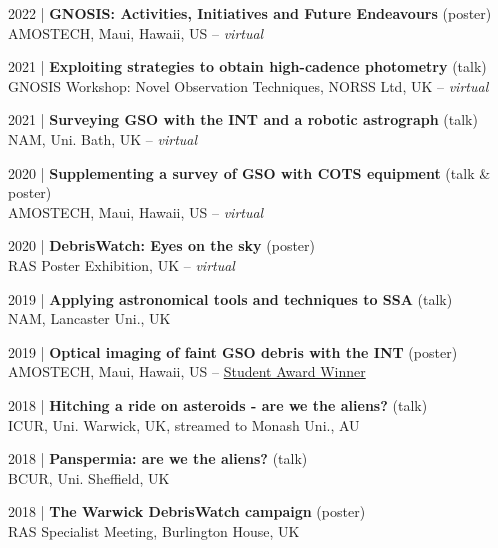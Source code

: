 \documentclass[10pt,a4paper]{altacv}
\begin{document}
\smallskip

\small 2022 | \textbf{GNOSIS: Activities, Initiatives and Future Endeavours} (poster) \\
AMOSTECH, Maui, Hawaii, US -- \textit{virtual}

\smallskip

\small 2021 | \textbf{Exploiting strategies to obtain high-cadence photometry} (talk) \\
GNOSIS Workshop: Novel Observation Techniques, NORSS Ltd, UK -- \textit{virtual}

\smallskip

\small 2021 | \textbf{Surveying GSO with the INT and a robotic astrograph} (talk) \\
NAM, Uni. Bath, UK -- \textit{virtual}

\smallskip

\small 2020 | \textbf{Supplementing a survey of GSO with COTS equipment} (talk \& poster) \\
AMOSTECH, Maui, Hawaii, US -- \textit{virtual}

\smallskip

\small 2020 | \textbf{DebrisWatch: Eyes on the sky} (poster) \\
RAS Poster Exhibition, UK -- \textit{virtual}

\smallskip

\small 2019 | \textbf{Applying astronomical tools and techniques to SSA} (talk) \\
NAM, Lancaster Uni., UK

\smallskip

\small 2019 | \textbf{Optical imaging of faint GSO debris with the INT} (poster) \\
AMOSTECH, Maui, Hawaii, US -- \href{https://amostech.com/2019-archive/}{Student Award Winner}

\smallskip

\small 2018 | \textbf{Hitching a ride on asteroids - are we the aliens?} (talk) \\
ICUR, Uni. Warwick, UK, streamed to Monash Uni., AU

\smallskip

\small 2018 | \textbf{Panspermia: are we the aliens?} (talk) \\
BCUR, Uni. Sheffield, UK

\smallskip

\small 2018 | \textbf{The Warwick DebrisWatch campaign} (poster) \\
RAS Specialist Meeting, Burlington House, UK
\end{document}
